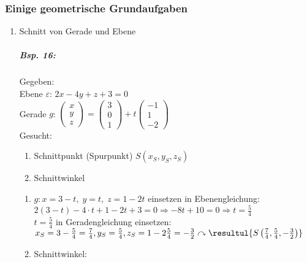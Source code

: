 \subsubsection{Einige geometrische Grundaufgaben}
\begin{enumerate}
\item Schnitt von Gerade und Ebene
\subparagraph{Bsp. 16:} \parskp
Gegeben:\\
Ebene $\varepsilon$: $2x-4y+z+3=0$\\
Gerade $g$: $\begin{pmatrix}
x\\
y\\
z
\end{pmatrix} = \begin{pmatrix}
3\\
0\\
1
\end{pmatrix}+t\begin{pmatrix}
-1\\
1\\
-2
\end{pmatrix}$\\
Gesucht:
\begin{enumerate}[label=\alph*.)]
\item Schnittpunkt (Spurpunkt) $S(x_S,y_S,z_S)$
\item Schnittwinkel
\end{enumerate}
\begin{enumerate}[label=zu \alph*.)]
\item $g: x=3-t, \; y=t, \; z=1-2t$ einsetzen in Ebenengleichung: $2(3-t)-4\cdot t+1-2t+3=0 \Rightarrow -8t+10=0 \Rightarrow t=\frac{5}{4}$\\
$t=\frac{5}{4}$ in Geradengleichung einsetzen: $x_S=3-\frac{5}{4}=\frac{7}{4}, y_S=\frac{5}{4}, z_S=1-2\frac{5}{4}=-\frac{3}{2} \\
\curvearrowright \resultul{S\left(\frac{7}{4},\frac{5}{4},-\frac{3}{2}\right)}$
\item Schnittwinkel:\\
\end{enumerate}
\end{enumerate}
